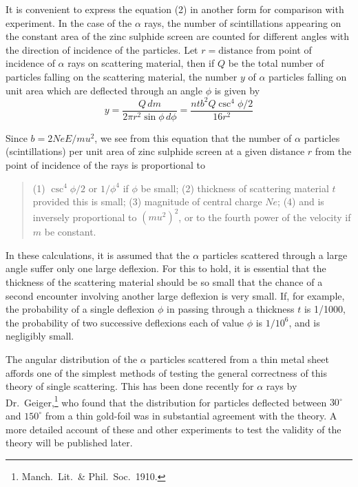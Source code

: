 \documentclass{article}
\begin{document}
It is convenient to express the equation (2) in another form for comparison with experiment.
In the case of the $\alpha$ rays, the number of scintillations appearing on the constant area of the zinc
sulphide screen are counted for different angles with the direction of incidence of the particles.
Let $r=\text{distance}$ from point of incidence of $\alpha$ rays on scattering material,
then if $Q$ be the total number of particles falling on the scattering material,
the number $y$ of $\alpha$ particles falling on unit area which are deflected through an angle $\phi$ is given by
\begin{equation*}
y=\frac{Q\,dm}{2\pi r^2\sin\phi\,d\phi}
=\frac{ntb^2Q\csc^4\phi/2}{16r^2}
\tag{5}
\end{equation*}

Since $b=2NeE/mu^2$,
we see from this equation that the number of $\alpha$ particles (scintillations) per unit area of zinc sulphide
screen at a given distance $r$ from the point of incidence of the rays is proportional to

\begin{quote}
(1) $\csc^4\phi/2$ or $1/\phi^4$ if $\phi$ be small;\newline
(2) thickness of scattering material $t$ provided this is small;\newline
(3) magnitude of central charge $Ne$;\newline
(4) and is inversely proportional to $(mu^2)^2$, or to the fourth power
of the velocity if $m$ be constant.
\end{quote}

In these calculations, it is assumed that the $\alpha$ particles scattered through a large angle suffer
only one large deflexion.
For this to hold, it is essential that the thickness of the scattering material should be so small that
the chance of a second encounter involving another large deflexion is very small.
If, for example, the probability of a single deflexion $\phi$ in passing through a thickness $t$ is 1/1000,
the probability of two successive deflexions each of value $\phi$ is $1/10^6$, and is negligibly small.

\bigskip
The angular distribution of the $\alpha$ particles scattered from a thin metal sheet affords one of the
simplest methods of testing the general correctness of this theory of single scattering.
This has been done recently for $\alpha$ rays by Dr.~Geiger,\footnote{Manch.~Lit.~\& Phil.~Soc.~1910.}
who found that the distribution for particles deflected between $30^\circ$ and $150^\circ$
from a thin gold-foil was in substantial agreement with the theory.
A more detailed account of these and other experiments to test the validity of the theory will be published later.
\end{document}

